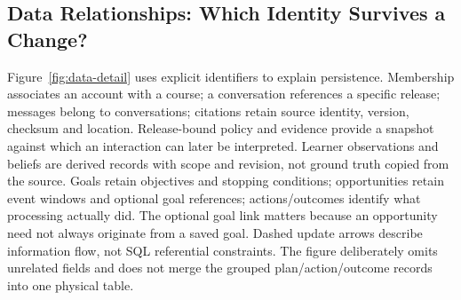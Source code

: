 \subsection{Data Relationships: Which Identity Survives a Change?}
Figure~\ref{fig:data-detail} uses explicit identifiers to explain persistence.
Membership associates an account with a course; a conversation references a
specific release; messages belong to conversations; citations retain source
identity, version, checksum and location. Release-bound policy and evidence
provide a snapshot against which an interaction can later be interpreted.
Learner observations and beliefs are derived records with scope and revision,
not ground truth copied from the source. Goals retain objectives and stopping
conditions; opportunities retain event windows and optional goal references;
actions/outcomes identify what processing actually did. The optional goal link
matters because an opportunity need not always originate from a saved goal.
Dashed update arrows describe information flow, not SQL referential constraints.
The figure deliberately omits unrelated fields and does not merge the grouped
plan/action/outcome records into one physical table.
